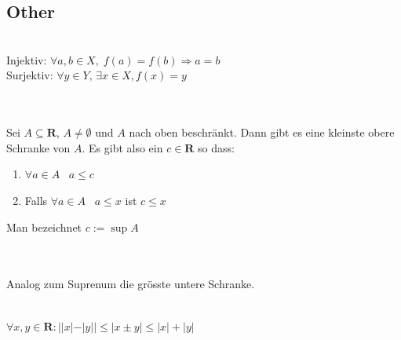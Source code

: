\documentclass[10pt]{article}
\begin{document}
\begin{multicols*}{3}
  \section{Other}
  \hypertarget{sec:3}{}
  \\
  Injektiv: $\forall a, b \in X, \;f(a) = f(b) \Rightarrow a = b$\\
  Surjektiv: $\forall y \in Y, \, \exists x \in X, f(x) = y$\\ \\
  \\
  Sei $A \subseteq \mathbf{R}$, $ A \neq \emptyset$ und $A$ nach oben beschränkt. Dann gibt es
  eine kleinste obere Schranke von $A$. Es gibt also ein $c \in \mathbf{R}$ so dass:
  \begin{enumerate}
    \item $\forall a \in A \; \; \; a \leq c$
    \item Falls $\forall a \in A \; \; \; a \leq x$ ist $c \leq x$
  \end{enumerate}
  Man bezeichnet $c := \sup A$ \\ \\
  \\
  Analog zum Suprenum die grösste untere Schranke.\\ \\
  \begin{center}
    $\forall x, y \in \mathbf{R} : ||x| - |y|| \leq |x \pm y| \leq |x| + |y|$
  \end{center}
  \begin{center}

\end{center}
\end{multicols*}
\end{document}
